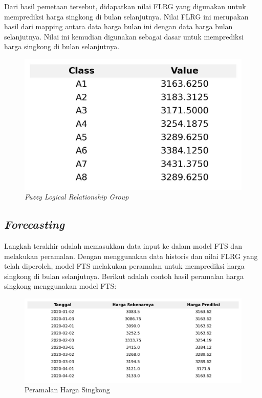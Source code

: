 \documentclass[conference]{IEEEtran}
\begin{document}
Dari hasil pemetaan tersebut, didapatkan nilai FLRG yang digunakan untuk memprediksi harga singkong di bulan selanjutnya. Nilai FLRG ini merupakan hasil dari mapping antara data harga bulan ini dengan data harga bulan selanjutnya. Nilai ini kemudian digunakan sebagai dasar untuk memprediksi harga singkong di bulan selanjutnya.

\begin{figure}[H]
    \centering
    \includegraphics[scale=0.7]{images/flrg_table.jpg} 
    \caption{\textit{Fuzzy Logical Relationship Group}}
\end{figure}

\subsection{\textit{Forecasting}}
Langkah terakhir adalah memasukkan data input ke dalam model FTS dan melakukan peramalan. Dengan menggunakan data historis dan nilai FLRG yang telah diperoleh, model FTS melakukan peramalan untuk memprediksi harga singkong di bulan selanjutnya. Berikut adalah contoh hasil peramalan harga singkong menggunakan model FTS:
\begin{figure}[H]
    \centering
    \includegraphics[width=\columnwidth]{images/tabel_perbandingan_harga.jpg} 
    \caption{Peramalan Harga Singkong}
\end{figure}
\end{document}
